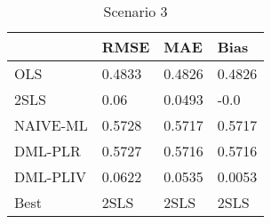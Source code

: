 \begin{table}[H]
\centering
\caption{Scenario 3}
\label{Scenario3}
\begin{tabular}{L{3.3333333333333335cm}L{2.6666666666666665cm}R{2.0cm}R{2.6666666666666665cm}}
\toprule
{} &    RMSE &     MAE &    Bias \\
\midrule
OLS      &  0.4833 &  0.4826 &  0.4826 \\
2SLS     &    0.06 &  0.0493 &    -0.0 \\
NAIVE-ML &  0.5728 &  0.5717 &  0.5717 \\
DML-PLR  &  0.5727 &  0.5716 &  0.5716 \\
DML-PLIV &  0.0622 &  0.0535 &  0.0053 \\
Best     &    2SLS &    2SLS &    2SLS \\
\bottomrule
\end{tabular}
\end{table}
